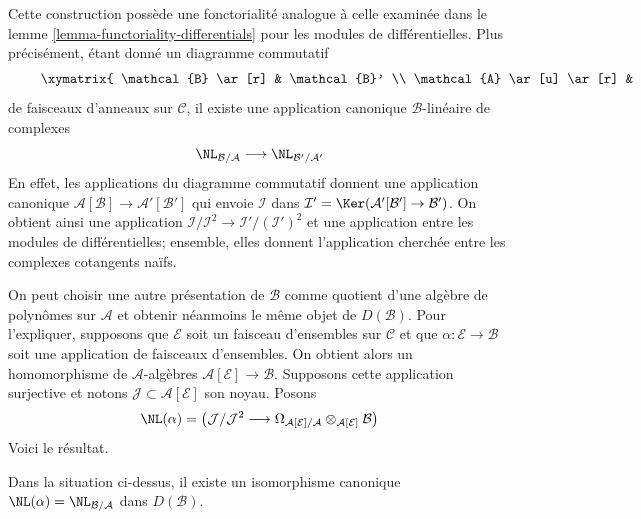 \noindent
Cette construction possède une fonctorialité analogue à celle examinée dans le
lemme \ref{lemma-functoriality-differentials} pour les modules de
différentielles. Plus précisément, étant donné un diagramme commutatif
\begin{equation}
\label{equation-commutative-square-sheaves}
\vcenter{
\xymatrix{
\mathcal{B} \ar[r] & \mathcal{B}' \\
\mathcal{A} \ar[u] \ar[r] & \mathcal{A}' \ar[u]
}
}
\end{equation}
de faisceaux d'anneaux sur $\mathcal{C}$, il existe une application canonique
$\mathcal{B}$-linéaire de complexes
$$
\NL_{\mathcal{B}/\mathcal{A}} \longrightarrow \NL_{\mathcal{B}'/\mathcal{A}'}
$$
En effet, les applications du diagramme commutatif donnent une application canonique
$\mathcal{A}[\mathcal{B}] \to \mathcal{A}'[\mathcal{B}']$
qui envoie $\mathcal{I}$ dans
$\mathcal{I}' = \Ker(\mathcal{A}'[\mathcal{B}'] \to \mathcal{B}')$.
On obtient ainsi une application
$\mathcal{I}/\mathcal{I}^2 \to \mathcal{I}'/(\mathcal{I}')^2$ et une
application entre les modules de différentielles; ensemble, elles donnent
l'application cherchée entre les complexes cotangents naïfs.

\medskip\noindent
On peut choisir une autre présentation de $\mathcal{B}$ comme quotient d'une
algèbre de polynômes sur $\mathcal{A}$ et obtenir néanmoins le même objet de
$D(\mathcal{B})$. Pour l'expliquer, supposons que $\mathcal{E}$ soit un
faisceau d'ensembles sur $\mathcal{C}$ et que
$\alpha : \mathcal{E} \to \mathcal{B}$ soit une application de faisceaux
d'ensembles. On obtient alors un homomorphisme de $\mathcal{A}$-algèbres
$\mathcal{A}[\mathcal{E}] \to \mathcal{B}$. Supposons cette application
surjective et notons $\mathcal{J} \subset \mathcal{A}[\mathcal{E}]$ son noyau.
Posons
$$
\NL(\alpha) = \left(
\mathcal{J}/\mathcal{J}^2
\longrightarrow
\Omega_{\mathcal{A}[\mathcal{E}]/\mathcal{A}}
\otimes_{\mathcal{A}[\mathcal{E}]} \mathcal{B}\right)
$$
Voici le résultat.

\begin{lemma}
\label{lemma-NL-up-to-qis}
Dans la situation ci-dessus, il existe un isomorphisme canonique
$\NL(\alpha) = \NL_{\mathcal{B}/\mathcal{A}}$ dans $D(\mathcal{B})$.
\end{lemma}

